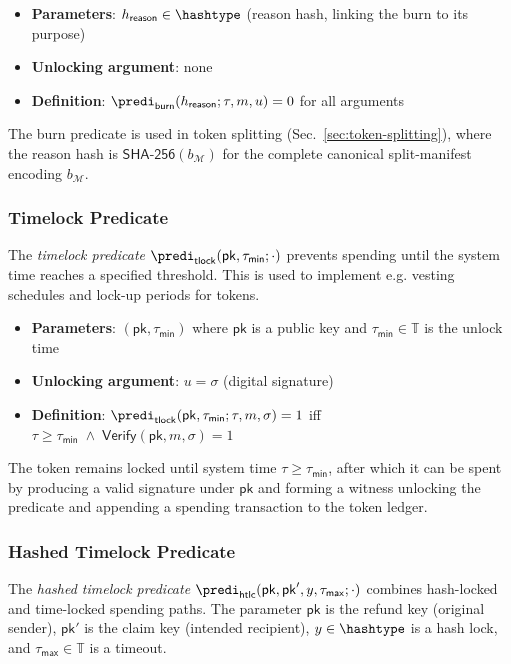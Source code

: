 \begin{itemize}
	\item \textbf{Parameters}: $h_\mathsf{reason} \in \hashtype$ (reason hash, linking the burn to its purpose)
	\item \textbf{Unlocking argument}: none
	\item \textbf{Definition}: $\predi_\mathsf{burn}(h_\mathsf{reason}; \tau, m, u) = 0$ for all arguments
\end{itemize}

The burn predicate is used in token splitting (Sec.~\ref{sec:token-splitting}), where the reason hash is $\mathsf{SHA\text{-}256}(b_\mathcal{M})$ for the complete canonical split-manifest encoding $b_\mathcal{M}$.


\subsubsection{Timelock Predicate}

The \emph{timelock predicate} $\predi_\mathsf{tlock}(\mathsf{pk}, \tau_\mathsf{min};\cdot)$ prevents spending until the system time reaches a specified threshold. This is used to implement e.g. vesting schedules and lock-up periods for tokens.

\begin{itemize}
	\item \textbf{Parameters}: $(\mathsf{pk}, \tau_\mathsf{min})$ where $\mathsf{pk}$ is a public key and $\tau_\mathsf{min} \in \mathbb{T}$ is the unlock time
	\item \textbf{Unlocking argument}: $u = \sigma$ (digital signature)
	\item \textbf{Definition}: $\predi_\mathsf{tlock}(\mathsf{pk}, \tau_\mathsf{min}; \tau, m, \sigma) = 1$ iff $\tau \ge \tau_\mathsf{min} \;\land\; \mathsf{Verify}(\mathsf{pk}, m, \sigma) = 1$
\end{itemize}

The token remains locked until system time $\tau \ge \tau_\mathsf{min}$, after which it can be spent by producing a valid signature under $\mathsf{pk}$ and forming a witness unlocking the predicate and appending a spending transaction to the token ledger.


\subsubsection{Hashed Timelock Predicate}

The \emph{hashed timelock predicate} $\predi_\mathsf{htlc}(\mathsf{pk}, \mathsf{pk}', y, \tau_\mathsf{max};\cdot)$ combines hash-locked and time-locked spending paths. The parameter $\mathsf{pk}$ is the refund key (original sender), $\mathsf{pk}'$ is the claim key (intended recipient), $y \in \hashtype$ is a hash lock, and $\tau_\mathsf{max} \in \mathbb{T}$ is a timeout.

